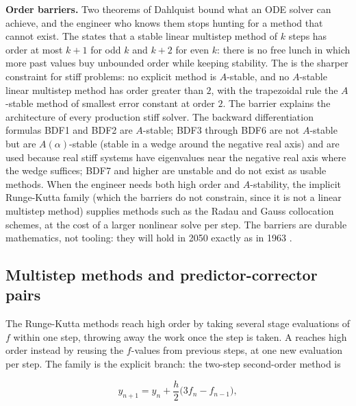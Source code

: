 \begin{mastery}
\textbf{Order barriers.} Two theorems of Dahlquist bound what an
ODE solver can achieve, and the engineer who knows them stops
hunting for a method that cannot exist. The  states that a stable linear multistep method of $k$ steps
has order at most $k + 1$ for odd $k$ and $k + 2$ for even $k$: there
is no free lunch in which more past values buy unbounded order while
keeping stability. The  is the
sharper constraint for stiff problems: no explicit method is
$A$-stable, and no $A$-stable linear multistep method has order
greater than $2$, with the trapezoidal rule the $A$-stable method of
smallest error constant at order $2$. The barrier explains the
architecture of every production stiff solver. The backward
differentiation formulas BDF1 and BDF2 are $A$-stable; BDF3 through
BDF6 are not $A$-stable but are $A(\alpha)$-stable (stable in a wedge
around the negative real axis) and are used because real stiff
systems have eigenvalues near the negative real axis where the wedge
suffices; BDF7 and higher are unstable and do not exist as usable
methods. When the engineer needs both high order and $A$-stability,
the implicit Runge-Kutta family (which the barriers do not constrain,
since it is not a linear multistep method) supplies methods such as
the Radau and Gauss collocation schemes, at the cost of a larger
nonlinear solve per step. The barriers are durable mathematics, not
tooling: they will hold in 2050 exactly as in 1963
\cite[ch.~10]{text:moler-numerical}.
\end{mastery}

\subsection{Multistep methods and predictor-corrector pairs}

The Runge-Kutta methods reach high order by taking several stage evaluations
of $f$ within one step, throwing away the work once the step is taken. A
 reaches high order instead by reusing the
$f$-values from previous steps, at one new evaluation per step. The
 family is the explicit branch: the two-step
second-order method is

\[
y_{n+1} = y_{n} + \frac{h}{2}\big(3 f_{n} - f_{n-1}\big),
\]

